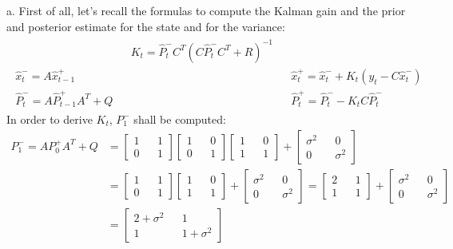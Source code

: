 \Answer[number={6}]
a. First of all, let's recall the formulas to compute the Kalman gain and the
prior and posterior estimate for the state and for the variance:
\begin{align*}
    \begin{matrix}
        {} && K_t=\hat{P}_t^-C^T(C\hat{P}_t^-C^T+R)^{-1} && {}\\
        \hat{x}_t^-=A\hat{x}_{t-1}^+ && {} && \hat{x}_t^+=\hat{x}_t^-+K_t(y_t-C\hat{x}_t^-)\\
        \hat{P}_t^-=A\hat{P}_{t-1}^+A^T+Q && {} && \hat{P}_t^+=\hat{P}_t^--K_tC\hat{P}_t^-
    \end{matrix}
\end{align*}
In order to derive \(K_t\), \(P_1^-\) shall be computed:
\begin{align*}
    P_1^-
    =AP_0^+A^T+Q
    &=
    \begin{bmatrix}
        1&&1\\0&&1
    \end{bmatrix}
    \begin{bmatrix}
        1&&0\\0&&1
    \end{bmatrix}
    \begin{bmatrix}
        1&&0\\1&&1
    \end{bmatrix}
    +
    \begin{bmatrix}
        \sigma^2&&0\\0&&\sigma^2
    \end{bmatrix}\\
    &=
    \begin{bmatrix}
        1&&1\\0&&1
    \end{bmatrix}
    \begin{bmatrix}
        1&&0\\1&&1
    \end{bmatrix}
    +
    \begin{bmatrix}
        \sigma^2&&0\\0&&\sigma^2
    \end{bmatrix}
    =
    \begin{bmatrix}
        2&&1\\1&&1
    \end{bmatrix}
    +
    \begin{bmatrix}
        \sigma^2&&0\\0&&\sigma^2
    \end{bmatrix}\\
    &=
    \begin{bmatrix}
        2+\sigma^2&&1\\1&&1+\sigma^2
    \end{bmatrix}
\end{align*}
